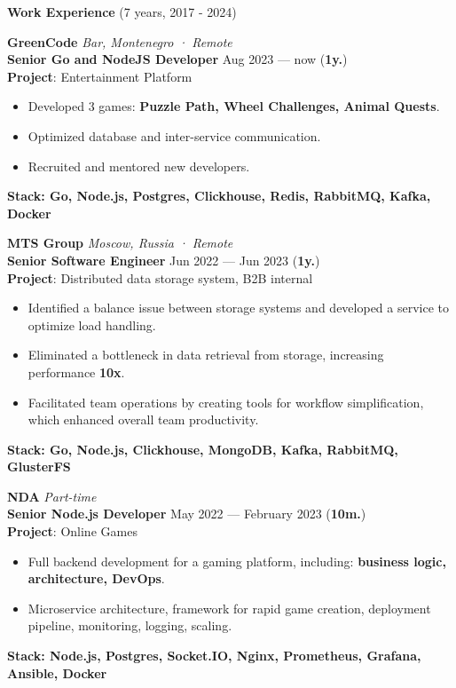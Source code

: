 \documentclass{resume}
\begin{document}
\begin{rSection}{\textbf{Work Experience} (7 years, 2017 - 2024) }

    \textbf{GreenCode} \hfill \textit{Bar, Montenegro · Remote} \\
    \textbf{Senior Go and NodeJS Developer}  \hfill Aug 2023 --- now ({\textbf{1y.}}) \\
    \textbf{Project}: Entertainment Platform
    \begin{itemize}
        \item Developed 3 games: \textbf{Puzzle Path, Wheel Challenges, Animal Quests}\@.
        \item Optimized database and inter-service communication\@.
        \item Recruited and mentored new developers\@.
    \end{itemize}
    \textbf{Stack: Go, Node.js, Postgres, Clickhouse, Redis, RabbitMQ, Kafka, Docker}

    \textbf{MTS Group} \hfill \textit{Moscow, Russia · Remote} \\
    \textbf{Senior Software Engineer}  \hfill Jun 2022 --- Jun 2023 ({\textbf{1y.}}) \\
    \textbf{Project}: Distributed data storage system, B2B internal
    \begin{itemize}
        \item Identified a balance issue between storage systems and developed a service to optimize load handling\@.
        \item Eliminated a bottleneck in data retrieval from storage, increasing performance \textbf{10x}\@.
        \item Facilitated team operations by creating tools for workflow simplification, which enhanced overall team productivity\@.
    \end{itemize}
    \textbf{Stack: Go, Node.js, Clickhouse, MongoDB, Kafka, RabbitMQ, GlusterFS}
    \clearpage

    \textbf{NDA} \hfill \textit{Part-time} \\
    \textbf{Senior Node.js Developer}  \hfill May 2022 --- February 2023 ({\textbf{10m.}}) \\
    \textbf{Project}: Online Games
    \begin{itemize}
        \item Full backend development for a gaming platform, including: \textbf{business logic, architecture, DevOps}\@.
        \item Microservice architecture, framework for rapid game creation, deployment pipeline, monitoring, logging, scaling\@.
    \end{itemize}
    \textbf{Stack: Node.js, Postgres, Socket.IO, Nginx, Prometheus, Grafana, Ansible, Docker}


\end{rSection}
\end{document}
